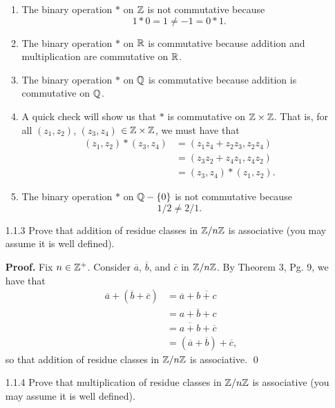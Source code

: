 \begin{enumerate}
      \begin{enumerate}      
         \item The binary operation $*$ on $\mathbb{Z}$ is not commutative because
               $$1 * 0 = 1 \neq -1 = 0 * 1.$$
         \item The binary operation $*$ on $\mathbb{R}$ is commutative because addition
               and multiplication are commutative on $\mathbb{R}$.
         \item The binary operation $*$ on $\mathbb{Q}$ is commutative because addition
               is commutative on $\mathbb{Q}$.
         \item A quick check will show us that $*$ is commutative on
               $\mathbb{Z} \times \mathbb{Z}$. That is, for all $(z_1, z_2)$, $(z_3, z_4)$
               $\in \mathbb{Z} \times \mathbb{Z}$, we must have that
               \begin{align*}
                  (z_1, z_2) * (z_3, z_4) &= (z_1z_4 + z_2z_3, z_2z_4) \\
                                          &= (z_3z_2 + z_4z_1, z_4z_2) \\
                                          &= (z_3, z_4) * (z_1, z_2).
               \end{align*}
         \item The binary operation $*$ on $\mathbb{Q} - \{0\}$ is not commutative
               because
               $$1/2 \neq 2/1.$$
      \end{enumerate}
   \item[1.1.3]   Prove that addition of residue classes in $\mathbb{Z}/n\mathbb{Z}$ is
                  associative (you may assume it is well defined).
                  
      \textbf{Proof.} Fix $n \in \mathbb{Z}^+$. Consider $\overline{a}$, $\overline{b}$,
      and $\overline{c}$ in $\mathbb{Z}/n\mathbb{Z}$. By Theorem 3, Pg. 9, we have that
      \begin{align*}
         \overline{a} + (\overline{b} + \overline{c})
            &= \overline{a} + \overline{b + c} \\
            &= \overline{a + b + c} \\
            &= \overline{a + b} + \overline{c} \\
            &= (\overline{a} + \overline{b}) + \overline{c},
      \end{align*}
      so that addition of residue classes in $\mathbb{Z}/n\mathbb{Z}$ is associative. \qed
   \item[1.1.4]   Prove that multiplication of residue classes in $\mathbb{Z}/n\mathbb{Z}$ is
                  associative (you may assume it is well defined).
                  

\end{enumerate}

